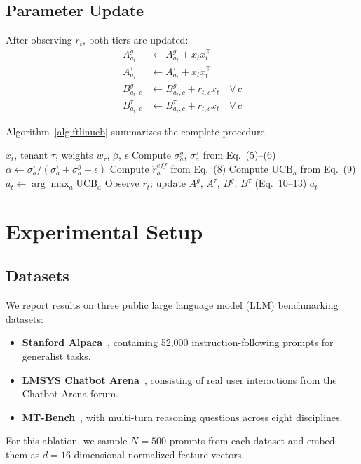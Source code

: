 \documentclass[conference]{IEEEtran}
\begin{document}
\subsection{Parameter Update}

After observing $r_t$, both tiers are updated:
\begin{align}
  A^g_{a_t} &\leftarrow A^g_{a_t} + x_t x_t^\top \\
  A^\tau_{a_t} &\leftarrow A^\tau_{a_t} + x_t x_t^\top \\
  B^g_{a_t,c} &\leftarrow B^g_{a_t,c} + r_{t,c} x_t
    \quad \forall\, c \\
  B^\tau_{a_t,c} &\leftarrow B^\tau_{a_t,c} + r_{t,c} x_t
    \quad \forall\, c
\end{align}

Algorithm~\ref{alg:ftlinucb} summarizes the complete procedure.

\begin{algorithm}
\caption{FT-LinUCB: Selection and Update}
\label{alg:ftlinucb}
\begin{algorithmic}[1]
\REQUIRE $x_t$, tenant $\tau$, weights $w_\tau$, $\beta$, $\epsilon$
  \STATE Compute $\sigma^g_a$, $\sigma^\tau_a$ from Eq.~(5)--(6)
  \STATE $\alpha \leftarrow \sigma^\tau_a /
    (\sigma^\tau_a + \sigma^g_a + \epsilon)$
  \STATE Compute $\hat{r}^{eff}_a$ from Eq.~(8)
  \STATE Compute $\text{UCB}_a$ from Eq.~(9)
\ENDFOR
\STATE $a_t \leftarrow \arg\max_a \text{UCB}_a$
\STATE Observe $r_t$; update $A^g$, $A^\tau$, $B^g$, $B^\tau$ (Eq.~10--13)
\RETURN $a_t$
\end{algorithmic}
\end{algorithm}

\section{Experimental Setup}

\subsection{Datasets}
We report results on three public large language model (LLM) benchmarking datasets:
\begin{itemize}
  \item \textbf{Stanford Alpaca}~\cite{alpaca}, containing 52,000 instruction-following prompts for generalist tasks.
  \item \textbf{LMSYS Chatbot Arena}~\cite{zheng2023judging}, consisting of real user interactions from the Chatbot Arena forum.
  \item \textbf{MT-Bench}~\cite{zheng2023judging}, with multi-turn reasoning questions across eight disciplines.
\end{itemize}
For this ablation, we sample $N = 500$ prompts from each dataset and embed them as $d = 16$-dimensional normalized feature vectors.
\end{document}
